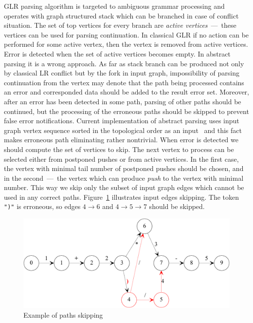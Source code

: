 \documentclass{acm_proc_article-sp}
\begin{document}
GLR parsing algorithm is targeted to ambiguous grammar processing and operates with graph structured stack which can be branched in case of conflict situation. The set of top vertices for every branch are {\it active vertices}~---~these vertices can be used for parsing continuation. In classical GLR if no action can be performed for some active vertex, then the vertex is removed from active vertices. Error is detected when the set of active vertices becomes empty. In abstract parsing it is a wrong approach. As far as stack branch can be produced not only by classical LR conflict but by the fork in input graph, impossibility of parsing continuation from the vertex may denote that the path being processed contains an error and corresponded data should be added to the result error set. Moreover, after an error has been detected in some path, parsing of other paths should be continued, but the processing of the erroneous paths should be skipped to prevent false error notifications. Current implementation of abstract parsing uses input graph vertex sequence sorted in the topological order as an input~\cite{AGLR} and this fact makes erroneous path eliminating rather nontrivial. When error is detected we should compute the set of vertices to skip. The next vertex to process can be selected either from postponed pushes or from active vertices. In the first case, the vertex with minimal tail number of postponed pushes should be chosen, and in the second~---~the vertex which can produce {\it push} to the vertex with minimal number. This way we skip only the subset of input graph edges which cannot be used in any correct paths. Figure~\ref{paths_ignoring} illustrates input edges skipping. The token \verb|")"| is erroneous, so edges $4 \to 6$ and $4 \to 5 \to 7$ should be skipped.

\begin{figure}[h!]
    \begin{center}
        \includegraphics[scale=0.4]{graphs/IgnoringPaths.pdf}
    \end{center}
    \caption{Example of paths skipping}
    \label{paths_ignoring}
\end{figure}
\end{document}
